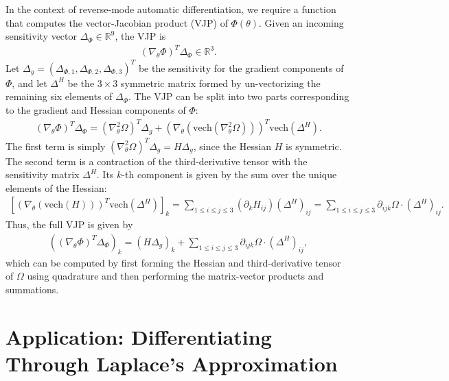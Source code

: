 \documentclass{article}
\begin{document}
In the context of reverse-mode automatic differentiation, we require a function that computes the vector-Jacobian product (VJP) of $\Phi(\theta)$.
Given an incoming sensitivity vector $\Delta_\Phi \in \mathbb{R}^9$, the VJP is
%
\begin{align}
  (\nabla_\theta \Phi)^T \Delta_\Phi \in \mathbb{R}^3.
\end{align}
%
Let $\Delta_g = (\Delta_{\Phi,1}, \Delta_{\Phi,2}, \Delta_{\Phi,3})^T$ be the sensitivity for the gradient components of $\Phi$, and let $\Delta^H$ be the $3 \times 3$ symmetric matrix formed by un-vectorizing the remaining six elements of $\Delta_\Phi$.
The VJP can be split into two parts corresponding to the gradient and Hessian components of $\Phi$:
%
\begin{align}
  (\nabla_\theta \Phi)^T \Delta_\Phi = (\nabla_\theta^2 \Omega)^T \Delta_g + (\nabla_\theta (\mathrm{vech}(\nabla_\theta^2 \Omega)))^T \mathrm{vech}(\Delta^H).
\end{align}
%
The first term is simply $(\nabla_\theta^2 \Omega)^T \Delta_g = H \Delta_g$, since the Hessian $H$ is symmetric.
The second term is a contraction of the third-derivative tensor with the sensitivity matrix $\Delta^H$.
Its $k$-th component is given by the sum over the unique elements of the Hessian:
%
\begin{align}
  \left[ (\nabla_\theta (\mathrm{vech}(H)))^T \mathrm{vech}(\Delta^H) \right]_k
  = \sum_{1 \le i \le j \le 3} (\partial_k H_{ij}) (\Delta^H)_{ij}
  = \sum_{1 \le i \le j \le 3} \partial_{ijk}\Omega \cdot (\Delta^H)_{ij}.
\end{align}
%
Thus, the full VJP is given by
%
\begin{align}\label{eq:vjp-full}
  \left( (\nabla_\theta \Phi)^T \Delta_\Phi \right)_k = (H \Delta_g)_k + \sum_{1 \le i \le j \le 3} \partial_{ijk}\Omega \cdot (\Delta^H)_{ij},
\end{align}
%
which can be computed by first forming the Hessian and third-derivative tensor of $\Omega$ using quadrature and then performing the matrix-vector products and summations.

\section{Application: Differentiating Through Laplace's Approximation}
\end{document}
